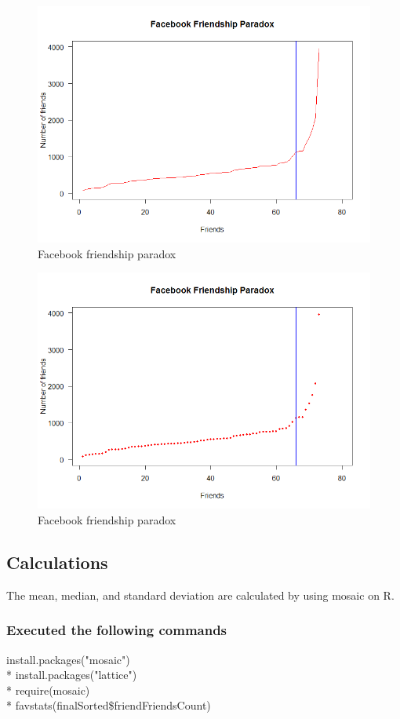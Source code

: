 \documentclass[12pt]{article}
\begin{document}
\begin{figure}[ht]
\includegraphics[scale=0.7]{../facebook/scatterplot1}
\centering
\caption{Facebook friendship paradox}
\label{intial-scatterplot}
\end{figure}


\begin{figure}[ht]
\includegraphics[scale=0.7]{../facebook/scatterplot2}
\centering
\caption{Facebook friendship paradox}
\label{scaled-scatterplot}
\end{figure}
\newpage
\subsection{Calculations}
The mean, median, and standard deviation are calculated by using mosaic on R.
\subsubsection{Executed the following commands}
install.packages("mosaic")\\*
install.packages("lattice")\\*
require(mosaic)\\*
favstats(finalSorted\$friendFriendsCount)
\end{document}
